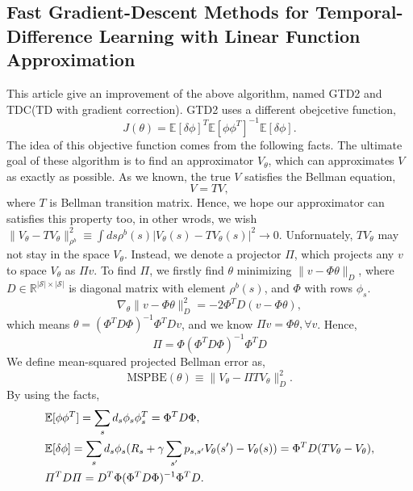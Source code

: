 \documentclass[11pt,a4paper]{article}
\def\E{\mathbb{E}}
\def\Pi{\varPi}
\begin{document}
\subsection{Fast Gradient-Descent Methods for Temporal-Difference Learning with Linear Function Approximation}
This article \cite{sutton2009fast} give an improvement of the above algorithm, named GTD2 and TDC(TD with gradient correction). GTD2 uses a different obejcetive function,
\begin{equation}
J(\theta) = \E[\delta \phi]^T \E[\phi \phi^T]^{-1} \E[\delta\phi].
\end{equation}
The idea of this objective function comes from the following facts. The ultimate goal of these algorithm is to find an approximator $V_{\theta}$, which can approximates $V$ as exactly as possible. As we known, the true $V$ satisfies the Bellman equation,
\begin{equation}
V = TV,
\end{equation}
where $T$ is Bellman transition matrix. Hence, we hope our approximator can satisfies this property too, in other wrods, we wish $\|V_{\theta}-TV_{\theta}\|^2_{\rho^b} \equiv \int ds \rho^b(s)|V_{\theta}(s)-TV_{\theta}(s)|^2 \to 0$. Unfornuately, $TV_{\theta}$ may not stay in the space $V_{\theta}$. Instead, we denote a projector $\Pi$, which projects any $v$ to space $V_{\theta}$ as $\Pi v$. To find $\Pi$, we firstly find $\theta$ minimizing $\|v-\Phi\theta\|_D$, where $D \in \mathbb{R}^{|\mathcal{S}|\times |\mathcal{S}|}$ is diagonal matrix with element $\rho^{b}(s)$, and $\Phi$ with rows $\phi_s$.
\begin{equation}
\nabla_{\theta} \|v - \Phi\theta\|_D^2 = -2\Phi^TD(v-\Phi\theta),
\end{equation}
which means $\theta = (\Phi^TD\Phi)^{-1}\Phi^TDv$, and we know $\Pi v=\Phi\theta, \forall v$. Hence,
\begin{equation}
\Pi = \Phi(\Phi^TD\Phi)^{-1}\Phi^TD
\end{equation}
We define mean-squared projected Bellman error as,
\begin{equation}
\mathrm{MSPBE}(\theta) \equiv \|V_{\theta}-\Pi TV_{\theta}\|^2_D.
\end{equation}
By using the facts,
\begin{equation}
\aligned 
&\E[\phi \phi^T] = \sum_s d_s\phi_s\phi_s^T = \Phi^T D \Phi,\\
& \E[\delta\phi] = \sum_s d_s\phi_s(R_s+\gamma \sum_{s'}p_{s,s'}V_{\theta}(s')-V_{\theta}(s)) = \Phi^T D (TV_{\theta} - V_{\theta}), \\ 
& \Pi^T D \Pi = D^T \Phi(\Phi^T D \Phi)^{-1} \Phi^T D.
\endaligned 
\end{equation}
\end{document}
